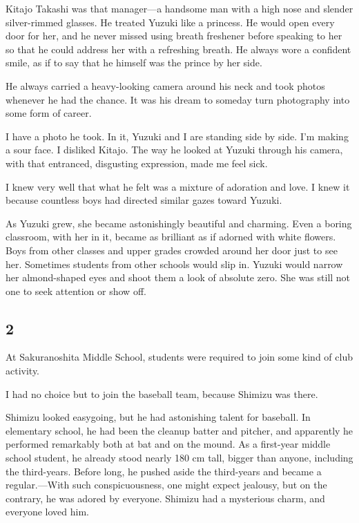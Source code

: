 \documentclass[
    a4paper,
    12pt,
    twoside,
    openany,
    UTF8,
    fontset=windows
]{ctexbook}
\begin{document}
Kitajo Takashi was that manager---a handsome man with a high nose and slender silver-rimmed glasses. He treated Yuzuki like a princess. He would open every door for her, and he never missed using breath freshener before speaking to her so that he could address her with a refreshing breath. He always wore a confident smile, as if to say that he himself was the prince by her side.

He always carried a heavy-looking camera around his neck and took photos whenever he had the chance. It was his dream to someday turn photography into some form of career.

I have a photo he took. In it, Yuzuki and I are standing side by side. I'm making a sour face. I disliked Kitajo. The way he looked at Yuzuki through his camera, with that entranced, disgusting expression, made me feel sick.

I knew very well that what he felt was a mixture of adoration and love. I knew it because countless boys had directed similar gazes toward Yuzuki.

As Yuzuki grew, she became astonishingly beautiful and charming. Even a boring classroom, with her in it, became as brilliant as if adorned with white flowers. Boys from other classes and upper grades crowded around her door just to see her. Sometimes students from other schools would slip in. Yuzuki would narrow her almond-shaped eyes and shoot them a look of absolute zero. She was still not one to seek attention or show off.


\subsection*{2}

At Sakuranoshita Middle School, students were required to join some kind of club activity.

I had no choice but to join the baseball team, because Shimizu was there.

Shimizu looked easygoing, but he had astonishing talent for baseball. In elementary school, he had been the cleanup batter and pitcher, and apparently he performed remarkably both at bat and on the mound. As a first-year middle school student, he already stood nearly 180 cm tall, bigger than anyone, including the third-years. Before long, he pushed aside the third-years and became a regular.---With such conspicuousness, one might expect jealousy, but on the contrary, he was adored by everyone. Shimizu had a mysterious charm, and everyone loved him.
\end{document}
